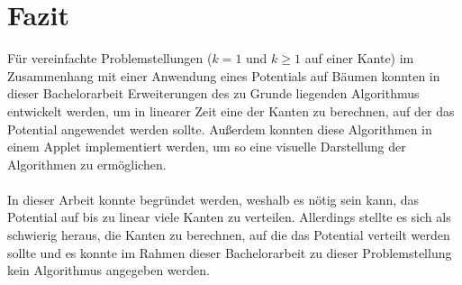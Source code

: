 \section{Fazit}


Für vereinfachte Problemstellungen ($k = 1$ und $k \geq 1$ auf einer Kante) im Zusammenhang mit einer Anwendung eines Potentials auf Bäumen konnten in dieser Bachelorarbeit Erweiterungen des zu Grunde liegenden Algorithmus entwickelt werden, um in linearer Zeit eine der Kanten zu berechnen, auf der das Potential angewendet werden sollte. Außerdem konnten diese Algorithmen in einem Applet implementiert werden, um so eine visuelle Darstellung der Algorithmen zu ermöglichen.
\\
\\
In dieser Arbeit konnte begründet werden, weshalb es nötig sein kann, das Potential auf bis zu linear viele Kanten zu verteilen. Allerdings stellte es sich als schwierig heraus, die Kanten zu berechnen, auf die das Potential verteilt werden sollte und es konnte im Rahmen dieser Bachelorarbeit zu dieser Problemstellung kein Algorithmus angegeben werden. 